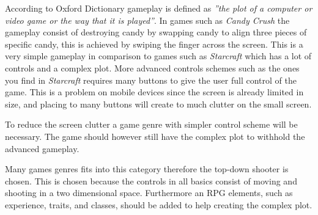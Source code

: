 According to Oxford Dictionary gameplay is defined as \textit{''the plot of a computer or video game or the way that it is played''}.
In games such as \textit{Candy Crush}  the gameplay consist of destroying candy by swapping candy to align three pieces of specific candy, this is achieved by swiping the finger across the screen.
This is a very simple gameplay in comparison to games such as \textit{Starcraft}  which has a lot of controls and a complex plot.
More advanced controls schemes such as the ones you find in \textit{Starcraft} requires many buttons to give the user full control of the game.
This is a problem on mobile devices since the screen is already limited in size, and placing to many buttons will create to much clutter on the small screen.

To reduce the screen clutter a game genre with simpler control scheme will be necessary.
The game should however still have the complex plot to withhold the advanced gameplay.

Many games genres fits into this category therefore the top-down shooter is chosen.
This is chosen because the controls in all basics consist of moving and shooting in a two dimensional space.
Furthermore an RPG elements, such as experience, traits, and classes, should be added to help creating the complex plot.